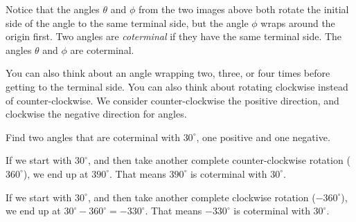 \documentclass[nooutcomes]{ximera}
\begin{document}
\begin{minipage}{.5\textwidth}
	\begin{image}[0.9\linewidth]
	\end{image}
\end{minipage}

Notice that the angles $\theta$ and $\phi$ from the two images above both rotate the initial side of the angle to the same terminal side, but the angle $\phi$ wraps around the origin first. Two angles are \emph{coterminal} if they have the same terminal side.
The angles $\theta$ and $\phi$ are coterminal. 

You can also think about an angle wrapping two, three, or four times before 
getting to the terminal side. You can also think about rotating clockwise instead of counter-clockwise. We consider counter-clockwise the positive direction, and clockwise the negative direction for angles. 

\begin{example}
	Find two angles that are coterminal with $30^\circ$, one positive and one negative.

	\begin{explanation}

		If we start with $30^\circ$, and then take another complete counter-clockwise rotation ($360^\circ$), we end up at $390^\circ$. That means $390^\circ$ is coterminal with $30^\circ$.

		If we start with $30^\circ$, and then take another complete clockwise rotation ($-360^\circ$), we end up at $30^\circ-360^\circ = -330^\circ$. That means $-330^\circ$ is coterminal with $30^\circ$.
	\end{explanation}
\end{example}
\end{document}

